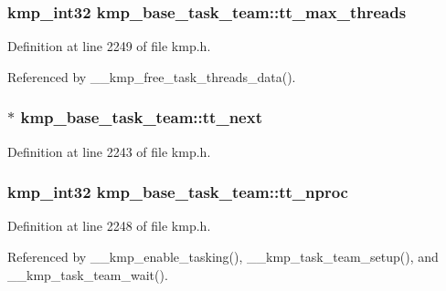 \hypertarget{structkmp__base__task__team_a0646ca6246f55d149ee022b5d9649a62}{
\subsubsection[{tt\-\_\-max\-\_\-threads}]{\setlength{\rightskip}{0pt plus 5cm}kmp\-\_\-int32 kmp\-\_\-base\-\_\-task\-\_\-team\-::tt\-\_\-max\-\_\-threads}}\label{structkmp__base__task__team_a0646ca6246f55d149ee022b5d9649a62}


Definition at line 2249 of file kmp.\-h.



Referenced by \-\_\-\-\_\-kmp\-\_\-free\-\_\-task\-\_\-threads\-\_\-data().

\hypertarget{structkmp__base__task__team_aafdbe28350091816c93ae8fb66b6c421}{
\subsubsection[{tt\-\_\-next}]{$\ast$ kmp\-\_\-base\-\_\-task\-\_\-team\-::tt\-\_\-next}}\label{structkmp__base__task__team_aafdbe28350091816c93ae8fb66b6c421}


Definition at line 2243 of file kmp.\-h.

\hypertarget{structkmp__base__task__team_a0e3fe27829e52d0100074babe5f7ed2d}{
\subsubsection[{tt\-\_\-nproc}]{\setlength{\rightskip}{0pt plus 5cm}kmp\-\_\-int32 kmp\-\_\-base\-\_\-task\-\_\-team\-::tt\-\_\-nproc}}\label{structkmp__base__task__team_a0e3fe27829e52d0100074babe5f7ed2d}


Definition at line 2248 of file kmp.\-h.



Referenced by \-\_\-\-\_\-kmp\-\_\-enable\-\_\-tasking(), \-\_\-\-\_\-kmp\-\_\-task\-\_\-team\-\_\-setup(), and \-\_\-\-\_\-kmp\-\_\-task\-\_\-team\-\_\-wait().

